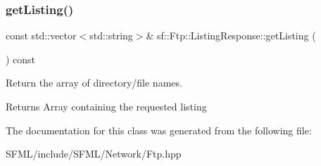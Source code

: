 \subsubsection{\texorpdfstring{getListing()}{getListing()}}
{\footnotesize\ttfamily const std\+::vector$<$std\+::string$>$\& sf\+::\+Ftp\+::\+Listing\+Response\+::get\+Listing (\begin{DoxyParamCaption}{ }\end{DoxyParamCaption}) const}



Return the array of directory/file names. 

\begin{DoxyReturn}{Returns}
Array containing the requested listing \begin{DoxyVerb}\end{DoxyVerb}
 
\end{DoxyReturn}


The documentation for this class was generated from the following file\+:\begin{DoxyCompactItemize}
\item 
S\+F\+M\+L/include/\+S\+F\+M\+L/\+Network/Ftp.\+hpp\end{DoxyCompactItemize}
